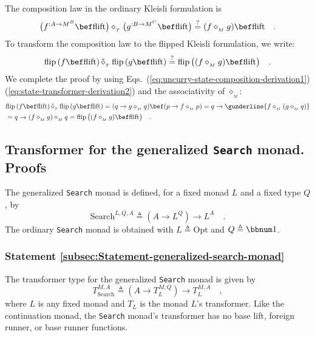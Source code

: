 The composition law in the ordinary Kleisli formulation is
\[
\big(f^{:A\rightarrow M^{B}}\bef\text{flift}\big)\diamond_{_{T}}\big(g^{:B\rightarrow M^{C}}\bef\text{flift}\big)\overset{?}{=}(f\diamond_{_{M}}g)\bef\text{flift}\quad.
\]
To transform the composition law to the flipped Kleisli formulation,
we write:
\[
\text{flip}\,(f\bef\text{flift})\,\tilde{\diamond}_{_{T}}\,\text{flip}\,(g\bef\text{flift})\overset{?}{=}\text{flip}\,\big((f\diamond_{_{M}}g)\bef\text{flift}\big)\quad.
\]
We complete the proof by using Eqs.~(\ref{eq:uncurry-state-composition-derivation1})\textendash (\ref{eq:state-transformer-derivation2})
and the associativity of $\diamond_{_{M}}$:
\begin{align*}
 & \text{flip}\,(f\bef\text{flift})\,\tilde{\diamond}_{_{T}}\,\text{flip}\,(g\bef\text{flift})=(q\rightarrow g\diamond_{_{M}}q)\bef(p\rightarrow f\diamond_{_{M}}p)=q\rightarrow\gunderline{f\diamond_{_{M}}(g\diamond_{_{M}}q)}\\
 & =q\rightarrow(f\diamond_{_{M}}g)\diamond_{_{M}}q=\text{flip}\,\big((f\diamond_{_{M}}g)\bef\text{flift}\big)\quad.
\end{align*}


\subsection{Transformer for the generalized \texttt{Search} monad. Proofs\label{subsec:Transformer-for-the-generalized-search-monad}}

The generalized
\lstinline!Search! monad is defined, for a fixed monad $L$ and a
fixed type $Q$, by
\[
\text{Search}^{L,Q,A}\triangleq(A\rightarrow L^{Q})\rightarrow L^{A}\quad.
\]
The ordinary \lstinline!Search! monad is obtained with $L\triangleq\text{Opt}$
and $Q\triangleq\bbnum 1$.

\subsubsection{Statement \label{subsec:Statement-generalized-search-monad}\ref{subsec:Statement-generalized-search-monad}}

The transformer type for the generalized \lstinline!Search! monad
is given by
\[
T_{\text{Search}}^{M,A}\triangleq(A\rightarrow T_{L}^{M,Q})\rightarrow T_{L}^{M,A}\quad,
\]
where $L$ is any fixed monad and $T_{L}$ is the monad $L$\textsf{'}s transformer.
Like the continuation monad, the \lstinline!Search! monad\textsf{'}s transformer
has no base lift, foreign runner, or base runner functions.

